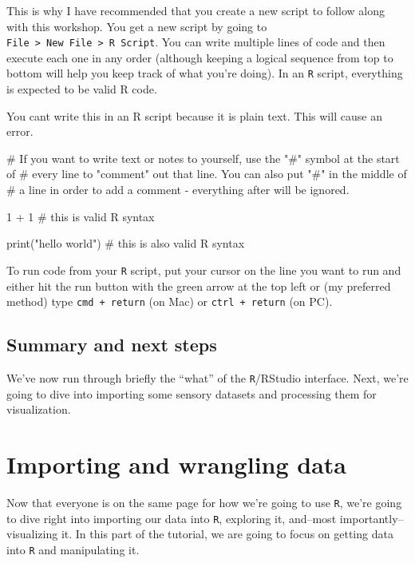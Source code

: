 \documentclass[
]{book}
\newenvironment{Shaded}{\begin{snugshade}}{\end{snugshade}}
\newcommand{\NormalTok}[1]{#1}
\newcommand{\StringTok}[1]{\textcolor[rgb]{0.31,0.60,0.02}{#1}}
\begin{document}
This is why I have recommended that you create a new script to follow along with this workshop. You get a new script by going to \texttt{File\ \textgreater{}\ New\ File\ \textgreater{}\ R\ Script}. You can write multiple lines of code and then execute each one in any order (although keeping a logical sequence from top to bottom will help you keep track of what you're doing). In an \texttt{R} script, everything is expected to be valid R code.

\begin{Shaded}
\begin{Highlighting}[]
\NormalTok{You can}\StringTok{\textquotesingle{}t write this in an R script because it is plain text.  This will}
\StringTok{cause an error.}

\StringTok{\# If you want to write text or notes to yourself, use the "\#" symbol at the start of }
\StringTok{\# every line to "comment" out that line.  You can also put "\#" in the middle of}
\StringTok{\# a line in order to add a comment {-} everything after will be ignored.}

\StringTok{1 + 1 \# this is valid R syntax}

\StringTok{print("hello world") \# this is also valid R syntax}
\end{Highlighting}
\end{Shaded}

To run code from your \texttt{R} script, put your cursor on the line you want to run and either hit the run button with the green arrow at the top left or (my preferred method) type \texttt{cmd\ +\ return} (on Mac) or \texttt{ctrl\ +\ return} (on PC).

\hypertarget{summary-and-next-steps}{%
\section{Summary and next steps}\label{summary-and-next-steps}}

We've now run through briefly the ``what'' of the \texttt{R}/RStudio interface. Next, we're going to dive into importing some sensory datasets and processing them for visualization.

\hypertarget{importing-and-wrangling-data}{%
\chapter{Importing and wrangling data}\label{importing-and-wrangling-data}}

Now that everyone is on the same page for how we're going to use \texttt{R}, we're going to dive right into importing our data into \texttt{R}, exploring it, and--most importantly--visualizing it. In this part of the tutorial, we are going to focus on getting data into \texttt{R} and manipulating it.
\end{document}
